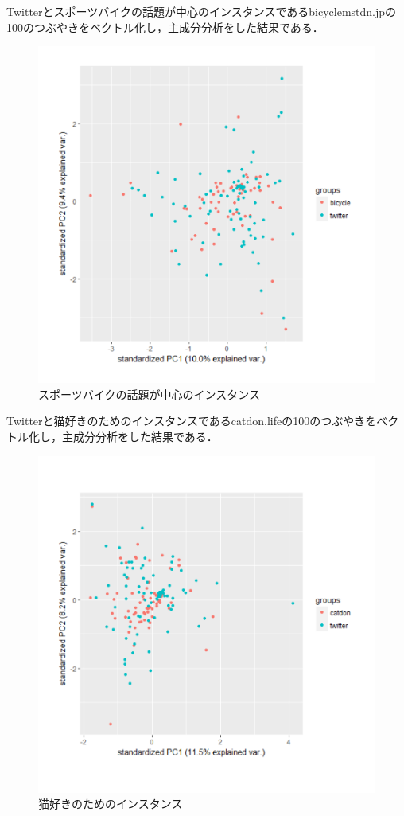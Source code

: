 Twitterとスポーツバイクの話題が中心のインスタンスであるbicyclemstdn.jpの100のつぶやきをベクトル化し，主成分分析をした結果である．
\begin{figure}[h]
\centering
\includegraphics[width=13cm,clip]{bicycle.pdf}
\caption{スポーツバイクの話題が中心のインスタンス}\label{bicycle}
\end{figure}
\newpage

Twitterと猫好きのためのインスタンスであるcatdon.lifeの100のつぶやきをベクトル化し，主成分分析をした結果である．
\begin{figure}[h]
\centering
\includegraphics[width=13cm,clip]{catdon.pdf}
\caption{猫好きのためのインスタンス}\label{catdon}
\end{figure}
\newpage

